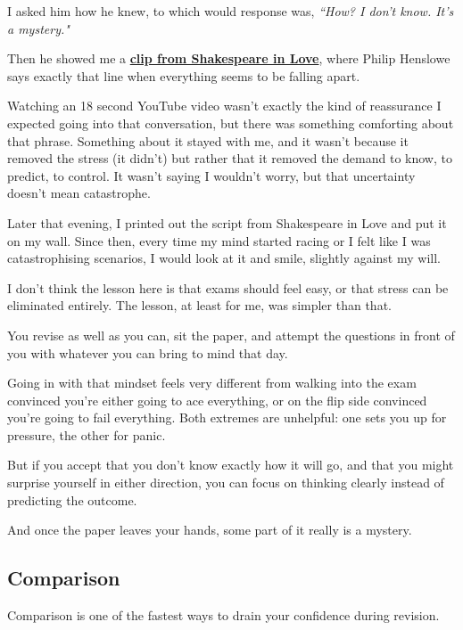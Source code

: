 I asked him how he knew, to which would response was, \textit{``How? I don’t know. It’s a mystery."}

Then he showed me a \textbf{\href{https://youtu.be/-hxTrm34oRI?si=08GXYMDkDqyzMvLp}{clip from Shakespeare in Love}}, where Philip Henslowe says exactly that line when everything seems to be falling apart.

Watching an 18 second YouTube video wasn’t exactly the kind of reassurance I expected going into that conversation, but there was something comforting about that phrase. Something about it stayed with me, and it wasn’t because it removed the stress (it didn’t) but rather that it removed the demand to know, to predict, to control. It wasn’t saying I wouldn’t worry, but that uncertainty doesn’t mean catastrophe.

Later that evening, I printed out the script from Shakespeare in Love and put it on my wall. Since then, every time my mind started racing or I felt like I was catastrophising scenarios, I would look at it and smile, slightly against my will.

I don’t think the lesson here is that exams should feel easy, or that stress can be eliminated entirely. The lesson, at least for me, was simpler than that.

You revise as well as you can, sit the paper, and attempt the questions in front of you with whatever you can bring to mind that day.

Going in with that mindset feels very different from walking into the exam convinced you’re either going to ace everything, or on the flip side convinced you’re going to fail everything. Both extremes are unhelpful: one sets you up for pressure, the other for panic. 

But if you accept that you don’t know exactly how it will go, and that you might surprise yourself in either direction, you can focus on thinking clearly instead of predicting the outcome.

And once the paper leaves your hands, some part of it really is a mystery.



\subsection{Comparison}

Comparison is one of the fastest ways to drain your confidence during revision. 

